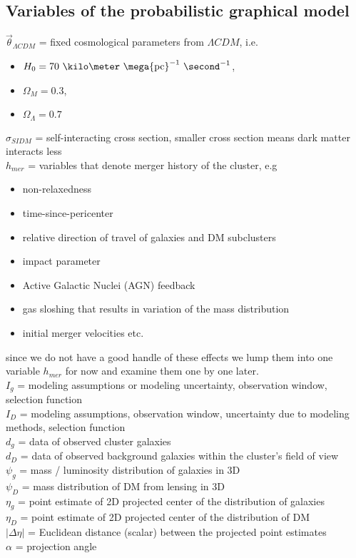 \subsection{Variables of the probabilistic graphical model}
$\vec{\theta}_{\Lambda CDM}$ = fixed cosmological parameters from $\Lambda
CDM$, i.e. 
\begin{itemize}
	\item $H_0 = 70~\kilo\meter~\mega {\rm pc}^{-1}~\second^{-1}$, 
	\item $\Omega_M = 0.3$, 
	\item $\Omega_\Lambda = 0.7$
\end{itemize}  
$\sigma_{SIDM}$ = self-interacting cross section, smaller cross section means dark
matter interacts less \\  
$h_{mer}$ = variables that denote merger history of the cluster, 
e.g 
\begin{itemize}
	\item non-relaxedness 
	\item time-since-pericenter
	\item relative direction of travel of galaxies and DM subclusters
	\item impact parameter
	\item Active Galactic Nuclei (AGN) feedback
	\item gas sloshing that results in variation of the mass distribution 
	\item initial merger velocities etc.
\end{itemize}
since we do not have a good handle of these effects we lump them into one
variable $h_{mer}$ for now and examine them one by one later. 
\\    
$I_{g}$ = modeling assumptions or modeling uncertainty, observation window, 
selection function\\ 
$I_{D}$ = modeling assumptions, observation window, uncertainty due to modeling
methods, selection function\\   
$d_{g}$ = data of observed cluster galaxies  \\ 
$d_{D}$ = data of observed background galaxies within the cluster's field of
view  \\ 
$\psi_{g}$ = mass / luminosity distribution of galaxies in 3D  \\ 
$\psi_{D}$ = mass distribution of DM from lensing in 3D \\ 
$\eta_{g}$ = point estimate of 2D projected center of the distribution of galaxies \\ 
$\eta_{D}$ = point estimate of 2D projected center of the distribution of DM \\ 
$|\Delta \eta|$ = Euclidean distance (scalar) between the projected point estimates\\   
$\alpha$ = projection angle\\ 


